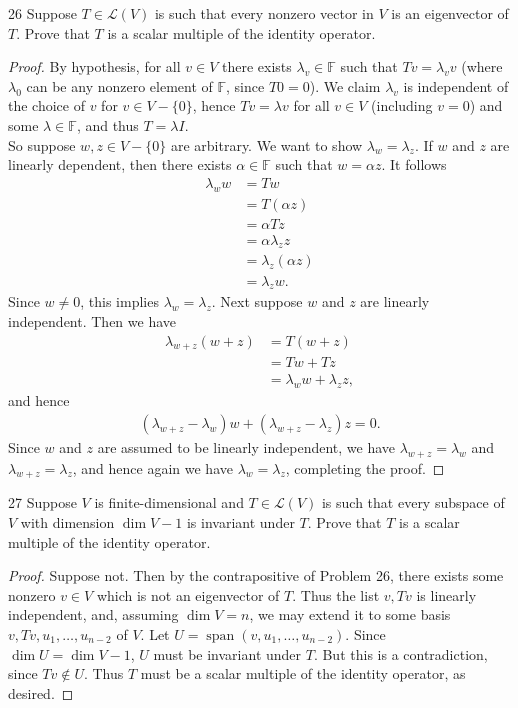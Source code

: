 \documentclass[11pt]{extarticle}
\newenvironment{problem}[1]{\begin{prob*}{#1}{}}{\end{prob*}}
\newcommand{\F}{\mathbb{F}}
\DeclareMathOperator{\Span}{span}
\newcommand{\Hom}{\mathcal{L}}
\begin{document}
\begin{problem}{26}
Suppose $T\in\Hom(V)$ is such that every nonzero vector in $V$ is an eigenvector of $T$.  Prove that $T$ is a scalar multiple of the identity operator.
\end{problem}
\begin{proof}
By hypothesis, for all $v\in V$ there exists $\lambda_v\in\F$ such that $Tv = \lambda_v v$ (where $\lambda_0$ can be any nonzero element of $\F$, since $T0 = 0$).  We claim $\lambda_v$ is independent of the choice of $v$ for $v\in V-\{0\}$, hence $Tv = \lambda v$ for all $v\in V$ (including $v = 0$) and some $\lambda \in \F$, and thus $T = \lambda I$.\\
\indent So suppose $w,z\in V-\{0\}$ are arbitrary.  We want to show $\lambda_w = \lambda_z$.  If $w$ and $z$ are linearly dependent, then there exists $\alpha\in\F$ such that $w=\alpha z$.  It follows
\begin{align*}
\lambda_w w &= Tw\\
&= T(\alpha z)\\
&= \alpha Tz \\
&= \alpha \lambda_z z\\
&= \lambda_z (\alpha z)\\
&= \lambda_z w.
\end{align*}
Since $w\neq 0$, this implies $\lambda_w = \lambda_z$.  Next suppose $w$ and $z$ are linearly independent.  Then we have
\begin{align*}
\lambda_{w + z} (w + z)&= T(w + z)\\
&= Tw + Tz\\
&= \lambda_w w + \lambda_z z,
\end{align*}
and hence
\begin{align*}
(\lambda_{w + z} - \lambda_w)w + (\lambda_{w + z} - \lambda_z)z = 0.
\end{align*}
Since $w$ and $z$ are assumed to be linearly independent, we have $\lambda_{w + z} = \lambda_w$ and $\lambda_{w + z} = \lambda_z$, and hence again we have $\lambda_w = \lambda_z$, completing the proof.
\end{proof}

\begin{problem}{27}
Suppose $V$ is finite-dimensional and $T\in\Hom(V)$ is such that every subspace of $V$ with dimension $\dim V - 1$ is invariant under $T$.  Prove that $T$ is a scalar multiple of the identity operator.
\end{problem}
\begin{proof}
Suppose not.  Then by the contrapositive of Problem 26, there exists some nonzero $v\in V$ which is not an eigenvector of $T$.  Thus the list $v, Tv$ is linearly independent, and, assuming $\dim V = n$, we may extend it to some basis $v, Tv, u_1, \dots, u_{n-2}$ of $V$.  Let $U = \Span(v, u_1,\dots, u_{n-2})$.  Since $\dim U = \dim V - 1$, $U$ must be invariant under $T$.  But this is a contradiction, since $Tv \not\in U$.  Thus $T$ must be a scalar multiple of the identity operator, as desired.
\end{proof}
\end{document}
